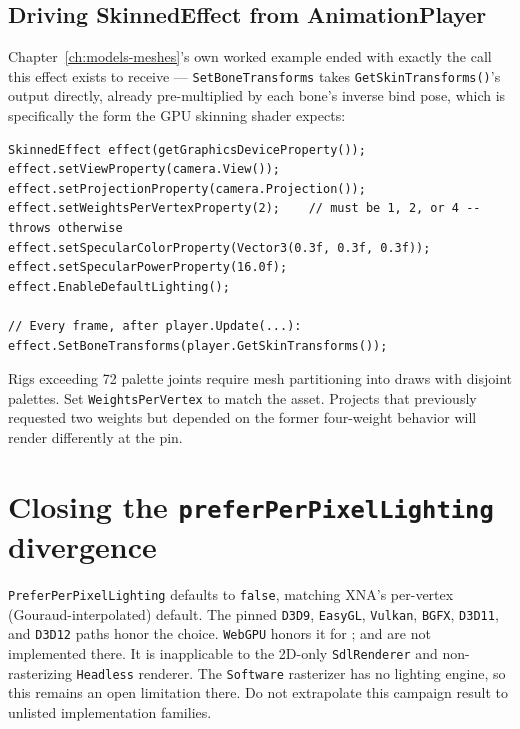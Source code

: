 \subsection{Driving SkinnedEffect from AnimationPlayer}

Chapter~\ref{ch:models-meshes}'s own worked  example ended with
exactly the call this effect exists to receive --- \texttt{SetBoneTransforms} takes
\texttt{GetSkinTransforms()}'s output directly, already pre-multiplied by each bone's inverse
bind pose, which is specifically the form the GPU skinning shader expects:

\begin{lstlisting}
SkinnedEffect effect(getGraphicsDeviceProperty());
effect.setViewProperty(camera.View());
effect.setProjectionProperty(camera.Projection());
effect.setWeightsPerVertexProperty(2);    // must be 1, 2, or 4 -- throws otherwise
effect.setSpecularColorProperty(Vector3(0.3f, 0.3f, 0.3f));
effect.setSpecularPowerProperty(16.0f);
effect.EnableDefaultLighting();

// Every frame, after player.Update(...):
effect.SetBoneTransforms(player.GetSkinTransforms());
\end{lstlisting}

Rigs exceeding 72 palette joints require mesh partitioning into draws with disjoint palettes.
Set \texttt{WeightsPerVertex} to match the asset. Projects that previously requested two weights
but depended on the former four-weight behavior will render differently at the pin.

\section{Closing the \texttt{preferPerPixelLighting} divergence}

\begin{contractnote}
\texttt{PreferPerPixelLighting} defaults to \texttt{false}, matching XNA's per-vertex
(Gouraud-interpolated) default. The pinned \texttt{D3D9}, \texttt{EasyGL}, \texttt{Vulkan},
\texttt{BGFX}, \texttt{D3D11}, and \texttt{D3D12} paths honor the choice. \texttt{WebGPU}
honors it for ;  and
 are not implemented there. It is inapplicable to the 2D-only
\texttt{SdlRenderer} and non-rasterizing \texttt{Headless} renderer. The \texttt{Software}
rasterizer has no lighting engine, so this remains an open limitation there. Do not extrapolate
this campaign result to unlisted implementation families.
\end{contractnote}

